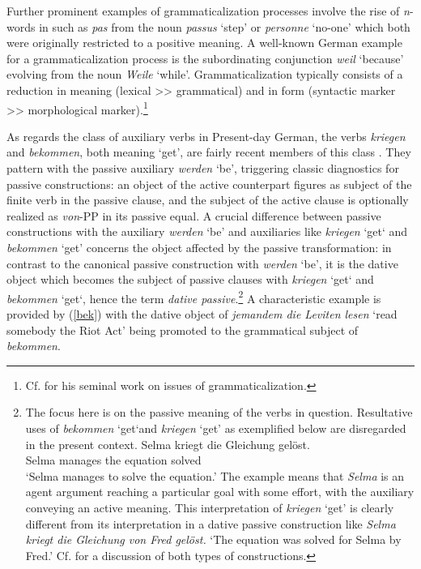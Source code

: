 \documentclass[output=paper
	        ,collection
	        ,collectionchapter
 	        ,biblatex
                ,babelshorthands
                ,newtxmath
                ,draftmode
                ,colorlinks, citecolor=brown
]{./langsci/langscibook}
\begin{document}
Further prominent examples of grammaticalization processes involve the rise of \textit{n}-words in  such as  \textit{pas} from the  noun \textit{passus} `step' or \textit{personne} `no-one' which both were originally restricted to a positive meaning. A well-known German example for a grammaticalization process is the subordinating conjunction \textit{weil} `because' evolving from the noun \textit{Weile} `while'. Grammaticalization typically consists of a reduction in meaning (lexical >> grammatical) and in form (syntactic marker >> morphological marker).\footnote{Cf. \cite{lehmann2015} for his seminal work on issues of grammaticalization.}

As regards the class of auxiliary verbs in Present-day German, the verbs \textit{kriegen} and \textit{bekommen}, both meaning `get', are fairly recent members of this class \citep{reis1976}. They pattern with the passive auxiliary \textit{werden} `be', triggering classic diagnostics for passive constructions: an object of the  active counterpart figures as subject of the finite verb in the passive clause, and the subject of the active clause is optionally realized as \textit{von}-PP in its passive equal. A crucial difference between passive constructions with the auxiliary \textit{werden} `be' and auxiliaries like \textit{kriegen} `get` and \textit{bekommen} `get' concerns the object affected by the passive transformation: in contrast to the canonical passive construction with \textit{werden} `be', it is the dative object which becomes the subject of passive clauses with \textit{kriegen} `get` and \textit{bekommen} `get`, hence the term \textit{dative passive}.\footnote{The focus here is on the passive meaning of the verbs in question. Resultative uses of \textit{bekommen} `get`and \textit{kriegen} `get' as exemplified below are disregarded in the present context. 
\ea
\gll Selma kriegt die Gleichung gelöst. \\ Selma manages the equation solved  \\
\glt  `Selma manages to solve the equation.' 
\z
The example means that \textit{Selma} is an agent argument reaching a particular goal with some effort, with the auxiliary conveying an active meaning. This interpretation of \textit{kriegen} `get' is clearly different from its interpretation in a dative passive construction like \textit{Selma kriegt die Gleichung von Fred gelöst.} `The equation was solved for Selma by Fred.' Cf. \cite{reis1985a} for a discussion of both types of constructions.}  A characteristic example is provided by (\ref{bek}) with the dative object of \textit{jemandem die Leviten lesen} `read somebody the Riot Act'  being promoted to the grammatical subject of \textit{bekommen}. 
\end{document}
